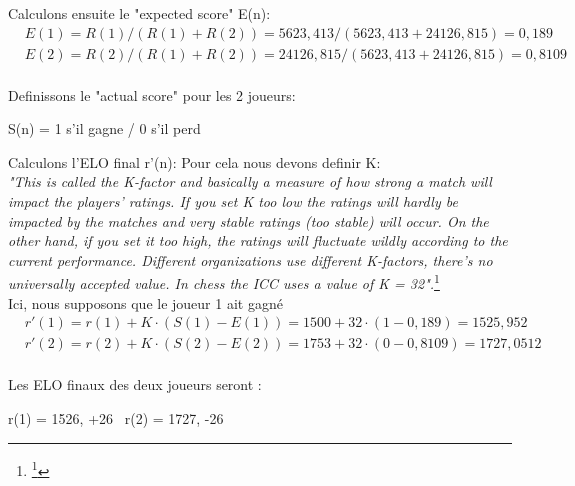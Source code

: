     Calculons ensuite le "expected score" E(n):
    \begin{equation}
        \begin{split}
            & E(1) = R(1) / ( R(1) + R(2)) = 5623,413 / (5623,413 + 24126,815) = 0,189 \\
            & E(2) = R(2) / ( R(1) + R(2)) = 24126,815 / (5623,413 + 24126,815) = 0,8109 \\
        \end{split}
    \end{equation}

    Definissons le "actual score" pour les 2 joueurs:
    \begin{center}
        S(n) = 1 s'il gagne / 0 s'il perd
    \end{center}
    
    Calculons l'ELO final r'(n):
    Pour cela nous devons definir K: \\
    \textit{"This is called the K-factor and basically a measure of how strong a match will impact the players’ ratings.
    If you set K too low the ratings will hardly be impacted by the matches and very stable ratings (too stable) will occur.
    On the other hand, if you set it too high, the ratings will fluctuate wildly according to the current performance.
     Different organizations use different K-factors, there’s no universally accepted value. In chess the ICC uses a value of K = 32".}\footnote{\footnote{\href{https://metinmediamath.wordpress.com/2013/11/27/how-to-calculate-the-elo-rating-including-example/}{Metin's Media and Math, How To Calculate the Elo-Rating }}} \\
    Ici, nous supposons que le joueur 1 ait gagné
    \begin{equation}
        \begin{split}
           & r'(1) = r(1) + K \cdot (S(1) - E(1)) = 1500 + 32 \cdot (1 - 0,189) = 1525,952 \\
           & r'(2) = r(2) + K \cdot (S(2) - E(2)) = 1753 + 32 \cdot (0-0,8109) = 1727,0512 \\
        \end{split}
    \end{equation}

    Les ELO finaux des deux joueurs seront :
    \begin{center}
        r(1) = 1526, +26 \ r(2) = 1727, -26
    \end{center}
    
